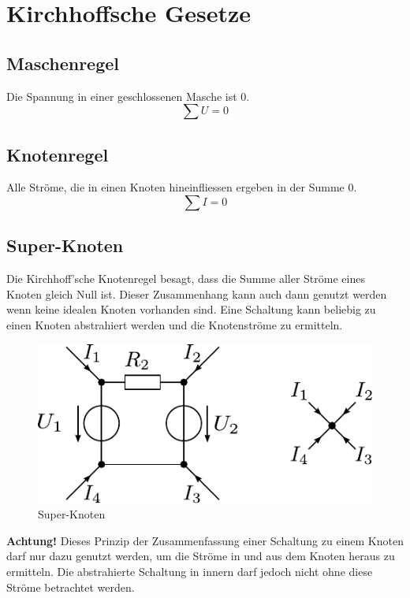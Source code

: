 



\section{Kirchhoffsche Gesetze}

\subsection{Maschenregel}
Die Spannung in einer geschlossenen Masche ist 0. 
\[ \sum U = 0 \]

\subsection{Knotenregel}
Alle Ströme, die in einen Knoten hineinfliessen ergeben in der Summe 0. 
\[ \sum I = 0 \]

\newpage
\subsection{Super-Knoten}
Die Kirchhoff'sche Knotenregel besagt, dass die Summe aller Ströme eines Knoten gleich Null ist.
Dieser Zusammenhang kann auch dann genutzt werden wenn keine idealen Knoten vorhanden sind.
Eine Schaltung kann beliebig zu einen Knoten abstrahiert werden und die Knotenströme zu ermitteln.

\begin{figure}[h!]
\centering
\includegraphics[scale=\schscale]{../fig/supernode_sch.pdf}
\caption{Super-Knoten}
\label{sch:supernode}
\end{figure}

\noindent
\textbf{Achtung!} Dieses Prinzip der Zusammenfassung einer Schaltung zu einem Knoten darf nur dazu genutzt werden, um die Ströme in und aus dem Knoten heraus zu ermitteln. Die abstrahierte Schaltung in innern darf jedoch nicht ohne diese Ströme betrachtet werden. 
